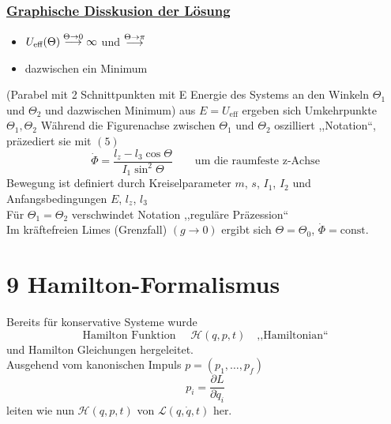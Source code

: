 \documentclass[titlepage,12pt,a4paper,ngerman]{report}
\newcommand{\tx}[1]{\textrm{#1}}
\newcommand{\lag}{\mathcal{L}}
\newcommand{\ham}{\mathcal{H}}
\newcommand{\const}{\tx{const.}}
\begin{document}
\subsubsection{\underline{Graphische Disskusion der Lösung}}
\begin{itemize}
	\item $ U_{\tx{eff}} (\Theta) \buildrel \Theta \rightarrow 0 \over \longrightarrow \infty $ und $ \buildrel \Theta \rightarrow \pi \over \longrightarrow $
	\item dazwischen ein Minimum
\end{itemize}
(Parabel mit 2 Schnittpunkten mit E Energie des Systems an den Winkeln $ \Theta_1 $ und $ \Theta_2 $ und dazwischen Minimum)
aus $ E = U_{\tx{eff}} $ ergeben sich Umkehrpunkte $ \Theta_1, \Theta_2 $ Während die Figurenachse zwischen $ \Theta_1 $ und $ \Theta_2 $ oszilliert ,,Notation``, präzediert sie mit $ (5) $
\begin{equation*}
\dot{\Phi} = \frac{l_z - l_3 \cos \Theta}{I_1 \sin^2 \Theta} \qquad \tx{um die raumfeste z-Achse}
\end{equation*}
Bewegung ist definiert durch Kreiselparameter  $m$, $s$, $ I_1 $, $ I_2 $ und Anfangsbedingungen $ E $, $ l_z $, $ l_3 $\\
Für $ \Theta_1 = \Theta_2 $ verschwindet Notation ,,reguläre Präzession``\\
Im kräftefreien Limes (Grenzfall) $ (g\rightarrow 0) $ ergibt sich $ \Theta = \Theta_0 $, $ \dot{\Phi} = \const $\\

\section{9 Hamilton-Formalismus}
Bereits für konservative Systeme wurde\\
$$ \tx{Hamilton Funktion } \quad \ham(q,p,t) \quad \tx{,,Hamiltonian``}$$
und Hamilton Gleichungen hergeleitet.\\
Ausgehend vom kanonischen Impuls $ p = (p_1,\dots,p_f) $
\begin{equation*}
p_i = \frac{\partial L}{\partial \dot{q}_i} \tag{1}
\end{equation*}
leiten wie nun $ \ham(q,p,t) $ von $ \lag(q,\dot{q},t) $ her.
\end{document}
